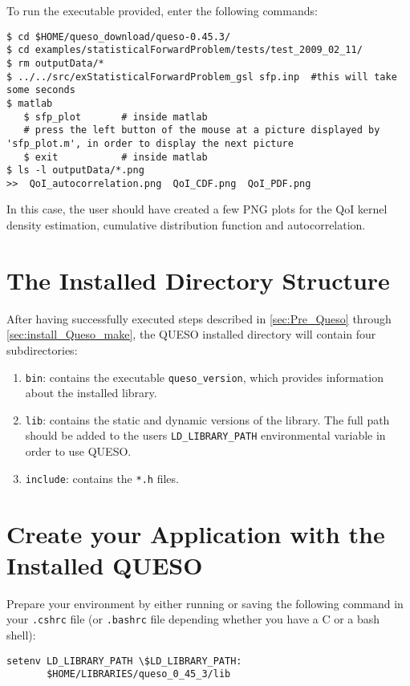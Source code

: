 To run the executable provided, enter the following commands:
\begin{lstlisting}[label={},caption={}]
$ cd $HOME/queso_download/queso-0.45.3/
$ cd examples/statisticalForwardProblem/tests/test_2009_02_11/
$ rm outputData/*
$ ../../src/exStatisticalForwardProblem_gsl sfp.inp  #this will take some seconds
$ matlab
   $ sfp_plot       # inside matlab
   # press the left button of the mouse at a picture displayed by 'sfp_plot.m', in order to display the next picture
   $ exit           # inside matlab
$ ls -l outputData/*.png
>>  QoI_autocorrelation.png  QoI_CDF.png  QoI_PDF.png  
\end{lstlisting}


In this case, the user should have created a few PNG plots for the QoI kernel density estimation, cumulative distribution function and autocorrelation.


\section{The Installed Directory Structure} \label{sc-installed-dir-structure}

After having successfully executed steps described in \textsection{}\ref{sec:Pre_Queso} through \textsection{}\ref{sec:install_Queso_make}, the QUESO installed directory will contain four subdirectories:
\begin{enumerate}
 \item \verb+bin+: contains the executable \verb+queso_version+, which provides information about the installed library.
 \item \verb+lib+: contains the static and dynamic versions of the library. The full path should be added to the users \verb+LD_LIBRARY_PATH+ environmental variable in order to use QUESO.
 \item \verb+include+: contains the \verb+*.h+ files.
\end{enumerate}


\section{Create your Application with the Installed QUESO} \label{sc-use-queso}

Prepare your environment by either running or saving the following command in your \verb+.cshrc+ file (or \verb+.bashrc+ file depending whether you have a C or a bash shell):

\begin{lstlisting}[label={},caption={}]
setenv LD_LIBRARY_PATH \$LD_LIBRARY_PATH:
       $HOME/LIBRARIES/queso_0_45_3/lib
\end{lstlisting}



